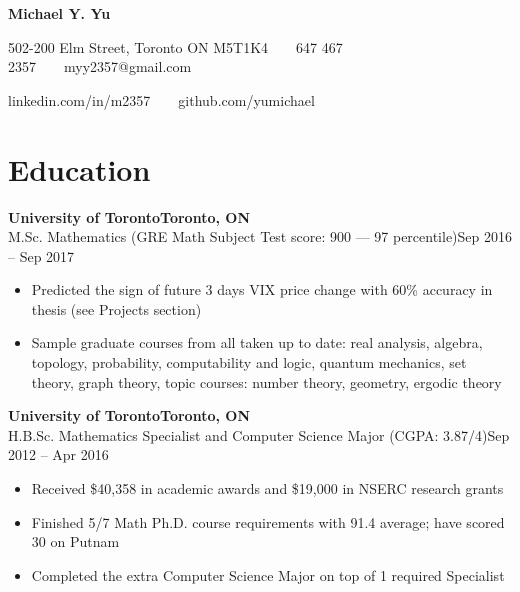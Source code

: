 \documentclass[10pt,letterpaper]{article}
\newcommand*\textmb[1]{\fontseries{b}\selectfont#1\fontseries{m}\selectfont}
\newcommand*\company[1]{\textbf{#1}}
\newcommand*\position[1]{\textmb{#1}}
\newcommand*\location\company
\newcommand*\timespan\position
\begin{document}
\pagestyle{empty}
\begin{center}
{\huge\textbf{Michael Y. Yu}}

502-200 Elm Street, Toronto ON M5T1K4\ \ \textbullet\ \ 647 467 2357\ \ \textbullet\ \ myy2357@gmail.com

linkedin.com/in/m2357\ \ \textbullet\ \ github.com/yumichael
\end{center}
\section*{Education}
\company{University of Toronto}\hfill\location{Toronto, ON}\\
\position{M.Sc. Mathematics} (GRE Math Subject Test score: 900 --- 97 percentile)\hfill\timespan{Sep 2016 -- Sep 2017}
\begin{itemize}
\item Predicted the sign of future 3 days VIX price change with 60\% accuracy in thesis (see Projects section)
\item Sample graduate courses from all taken up to date: real analysis, algebra, topology, probability, computability and logic, quantum mechanics, set theory, graph theory, topic courses: number theory, geometry, ergodic theory
\end{itemize}
\company{University of Toronto}\hfill\location{Toronto, ON}\\
\position{H.B.Sc. Mathematics Specialist and Computer Science Major} (CGPA: 3.87/4)\hfill\timespan{Sep 2012 -- Apr 2016}
\begin{itemize}
\item Received \$40,358 in academic awards and \$19,000 in NSERC research grants
\item Finished 5/7 Math Ph.D. course requirements with 91.4 average; have scored 30 on Putnam
\item Completed the extra Computer Science Major on top of 1 required Specialist
\end{itemize}
\end{document}
